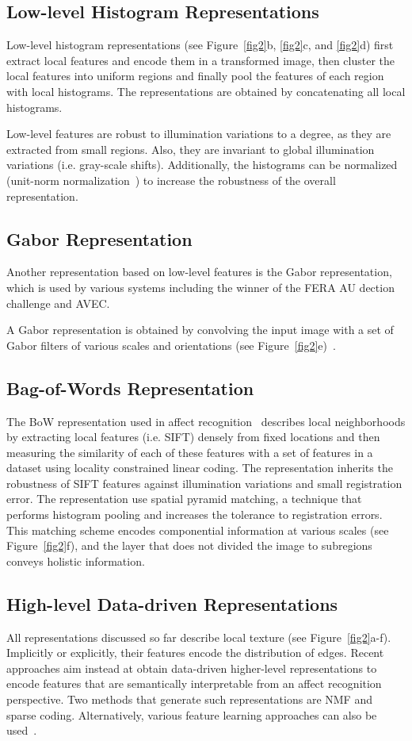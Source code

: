 \documentclass[10pt,twocolumn,letterpaper]{article}
\begin{document}
	\subsection*{Low-level Histogram Representations}
	Low-level histogram representations (see Figure~\ref{fig2}b, \ref{fig2}c, and \ref{fig2}d) first extract local features and encode them in a transformed image, then cluster the local features into uniform regions and finally pool the features of each region with local histograms. The representations are obtained by concatenating all local histograms.
	\par
	Low-level features are robust to illumination variations to a degree, as they are extracted from small regions. Also, they are invariant to global illumination variations (i.e. gray-scale shifts). Additionally, the histograms can be normalized (\eg unit-norm normalization~\cite{Dalal}) to increase the robustness of the overall representation.
	\subsection*{Gabor Representation}
	Another representation based on low-level features is the Gabor representation, which is used by various systems including the winner of the FERA AU dection challenge and AVEC.
	\par
	A Gabor representation is obtained by convolving the input image with a set of Gabor filters of various scales and orientations (see Figure~\ref{fig2}e)~\cite{M1993Distortion,Wiskott}.
	\subsection*{Bag-of-Words Representation}
	The BoW representation used in affect recognition~\cite{Sikka} describes local neighborhoods by extracting local features (i.e. SIFT) densely from fixed locations and then measuring the similarity of each of these features with a set of features in a dataset using locality constrained linear coding. The representation inherits the robustness of SIFT features against illumination variations and small registration error. The representation use spatial pyramid matching, a technique that performs histogram pooling and increases the tolerance to registration errors. This matching scheme encodes componential information at various scales (see Figure~\ref{fig2}f), and the layer that does not divided the image to subregions conveys holistic information.
	\subsection*{High-level Data-driven Representations}
	All representations discussed so far describe local texture (see Figure~\ref{fig2}a-f). Implicitly or explicitly, their features encode the distribution of edges. Recent approaches aim instead at obtain data-driven higher-level representations to encode features that are semantically interpretable from an affect recognition perspective. Two methods that generate such representations are NMF and sparse coding. Alternatively, various feature learning approaches can also be used~\cite{Paredes}.
\end{document}
